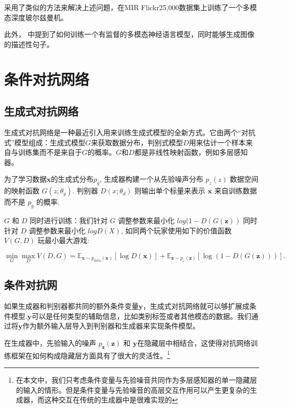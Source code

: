 \documentclass{article} %
\begin{document}
\cite{Srivastava+Salakhutdinov-NIPS2012-small}采用了类似的方法来解决上述问题，在MIR Flickr25,000数据集上训练了一个多模态深度玻尔兹曼机。

此外，\cite{kiros2013multimodal} 中提到了如何训练一个有监督的多模态神经语言模型，同时能够生成图像的描述性句子。

\section{条件对抗网络}
\subsection{生成式对抗网络}
生成式对抗网络是一种最近引入用来训练生成式模型的全新方式。它由两个“对抗式”模型组成：生成式模型$G$来获取数据分布，判别式模型$D$用来估计一个样本来自与训练集而不是来自于$G$的概率。$G$和$D$都是非线性映射函数，例如多层感知器。

为了学习数据${\bm{x}}$的生成式分布${p_g}$, 生成器构建一个从先验噪声分布 ${p_z(z)}$ 数据空间的映射函数 ${G(z;\theta_g)}$. 判别器 ${D(x; \theta_d)}$ 则输出单个标量来表示 ${\bm{x}}$ 来自训练数据而不是 ${p_g}$ 的概率.

${G}$ 和 ${D}$ 同时进行训练：我们针对 ${G}$ 调整参数来最小化 ${log(1-D(G(\bm{z}))}$ 同时针对 $D$ 调整参数来最小化 ${logD(X)}$, 如同两个玩家使用如下的价值函数 ${V(G, D)}$ 玩最小最大游戏:


\begin{equation}
\label{eq:minimaxgame-definition}
\min_G \max_D V(D, G) = \mathbb{E}_{\bm{x} \sim p_{\text{data}}(\bm{x})}[\log D(\bm{x})] + \mathbb{E}_{\bm{z} \sim p_z(\bm{z})}[\log (1 - D(G(\bm{z})))].
\end{equation}


\subsection{条件对抗网}

如果生成器和判别器都共同的额外条件变量${\bm{y}}$，生成式对抗网络就可以够扩展成条件模型.${\bm{y}}$可以是任何类型的辅助信息，比如类别标签或者其他模态的数据。我们通过将${\bm{y}}$作为额外输入层导入到判别器和生成器来实现条件模型。


在生成器中，先验输入的噪声 $p_{\bm{z}}(\bm{z})$ 和 ${\bm{y}}$在隐藏层中相结合，这使得对抗网络训练框架在如何构成隐藏层方面具有了很大的灵活性。\footnote{在本文中，我们只考虑条件变量与先验噪音共同作为多层感知器的单一隐藏层的输入的情形。但是条件变量与先验噪音的高层交互作用可以产生更复杂的生成器，而这种交互在传统的生成器中是很难实现的}
\end{document}
